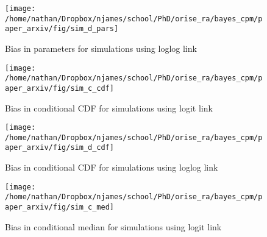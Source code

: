 \documentclass[
]{article}
\newcommand{\beginsupplement}{
  \setcounter{table}{0}
  \renewcommand{\thetable}{S\arabic{table}}
  \setcounter{figure}{0}
  \renewcommand{\thefigure}{S\arabic{figure}}
}
\begin{document}
\beginsupplement

\begin{figure}

{\centering \texttt{[image: /home/nathan/Dropbox/njames/school/PhD/orise\_ra/bayes\_cpm/paper\_arxiv/fig/sim\_d\_pars]} 

}

\caption{Bias in parameters for simulations using loglog link}\label{fig:simplt-pars-3}
\end{figure}

\begin{figure}

{\centering \texttt{[image: /home/nathan/Dropbox/njames/school/PhD/orise\_ra/bayes\_cpm/paper\_arxiv/fig/sim\_c\_cdf]} 

}

\caption{Bias in conditional CDF for simulations using logit link}\label{fig:simplt-cdf-2}
\end{figure}

\begin{figure}

{\centering \texttt{[image: /home/nathan/Dropbox/njames/school/PhD/orise\_ra/bayes\_cpm/paper\_arxiv/fig/sim\_d\_cdf]} 

}

\caption{Bias in conditional CDF for simulations using loglog link}\label{fig:simplt-cdf-3}
\end{figure}

\begin{figure}

{\centering \texttt{[image: /home/nathan/Dropbox/njames/school/PhD/orise\_ra/bayes\_cpm/paper\_arxiv/fig/sim\_c\_med]} 

}

\caption{Bias in conditional median for simulations using logit link}\label{fig:simplt-med-2}
\end{figure}
\end{document}
